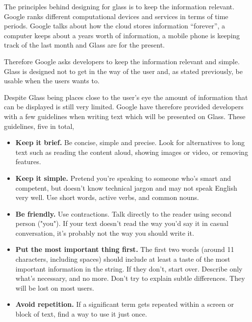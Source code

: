 The principles behind designing for glass is to keep the information relevant. Google ranks different computational devices and services in terms of time periods. Google talks about how the cloud stores information ``forever'', a computer keeps about a years worth of information, a mobile phone is keeping track of the last month and Glass are for the present.

Therefore Google asks developers to keep the information relevant and simple. Glass is designed not to get in the way of the user and, as stated previously, be usable when the users wants to.\cite{glassDesignPrinciples}

Despite Glass being places close to the user's eye the amount of information that can be displayed is still very limited. Google have therefore provided developers with a few guidelines when writing text which will be presented on Glass. These guidelines, five in total, 




\begin{itemize}
	\item \textbf{Keep it brief.} Be concise, simple and precise. Look for alternatives to long text such as reading the content aloud, showing images or video, or removing features.
	\item \textbf{Keep it simple.} Pretend you're speaking to someone who's smart and competent, but doesn't know technical jargon and may not speak English very well. Use short words, active verbs, and common nouns.
	\item \textbf{Be friendly.} Use contractions. Talk directly to the reader using second person ("you"). If your text doesn't read the way you'd say it in casual conversation, it's probably not the way you should write it.
	\item \textbf{Put the most important thing first.} The first two words (around 11 characters, including spaces) should include at least a taste of the most important information in the string. If they don't, start over. Describe only what's necessary, and no more. Don't try to explain subtle differences. They will be lost on most users.
	\item \textbf{Avoid repetition.} If a significant term gets repeated within a screen or block of text, find a way to use it just once.
\end{itemize}

